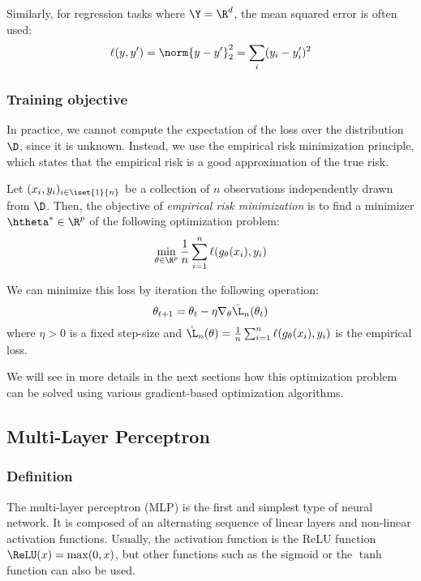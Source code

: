 Similarly, for regression tasks where $\Y=\R^d$, the mean squared error is often used:
\begin{equation*}
    \ell(y, y') = \norm{y-y'}^2_2 = \sum_i (y_i-y'_i)^2
\end{equation*}

\subsubsection{Training objective}
In practice, we cannot compute the expectation of the loss over the distribution $\D$, since it is unknown. Instead, we use the empirical risk minimization principle, which states that the empirical risk is a good approximation of the true risk.

Let $(x_i, y_i)_{i\in\iset{1}{n}}$ be a collection of $n$ observations independently drawn from $\D$. Then, the objective of \emph{empirical risk minimization} is to find a minimizer $\htheta^*\in\R^p$ of the following optimization problem:
\begin{equation*}
    \min_{\theta\in\R^p} \frac{1}{n} \sum_{i=1}^n \ell(g_\theta(x_i), y_i)
\end{equation*}

We can minimize this loss by iteration the following operation:
\begin{equation*}
    \theta_{t+1} = \theta_t - \eta \nabla_\theta \hat{\L}_n(\theta_t)
\end{equation*}
where $\eta>0$ is a fixed step-size and $\hat{\L}_n(\theta)=\frac{1}{n}\sum_{i=1}^n\ell(g_{\theta}(x_i), y_i)$ is the empirical loss.

We will see in more details in the next sections how this optimization problem can be solved using various gradient-based optimization algorithms.

\subsection{Multi-Layer Perceptron}
\subsubsection{Definition}
The multi-layer perceptron (MLP) is the first and simplest type of neural network. It is composed of an alternating sequence of linear layers and non-linear activation functions. Usually, the activation function is the ReLU function $\ReLU(x) = \max(0, x)$, but other functions such as the sigmoid or the $\tanh$ function can also be used.

